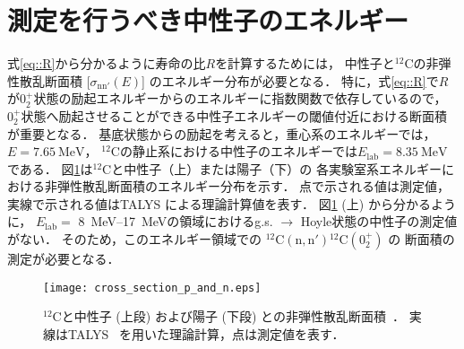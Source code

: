 \documentclass[../master]{subfiles}
\begin{document}
\section{測定を行うべき中性子のエネルギー}
式\eqref{eq::R}から分かるように寿命の比$R$を計算するためには，
中性子と${}^{12}\mathrm{C}$の非弾性散乱断面積 [$\sigma_\mathrm{nn'} (E)$] のエネルギー分布が必要となる．
特に，式\eqref{eq::R}で$R$が$0_2^+$状態の励起エネルギーからのエネルギーに指数関数で依存しているので，
$0_2^+$状態へ励起させることができる中性子エネルギーの閾値付近における断面積が重要となる．
基底状態からの励起を考えると，重心系のエネルギーでは，$E=\SI{7.65}{\mega\electronvolt}$，
${}^{12}\mathrm{C}$の静止系における中性子のエネルギーでは$E_{\text{lab}} = \SI{8.35}{\mega\electronvolt}$である．
図\ref{fig::crosssection_pres}は${}^{12}\mathrm{C}$と中性子（上）または陽子（下）の
各実験室系エネルギーにおける非弾性散乱断面積のエネルギー分布を示す．
点で示される値は測定値，実線で示される値はTALYS による理論計算値を表す．
図\ref{fig::crosssection_pres} (上) から分かるように，
$E_{\text{lab}} =$ \SIrange{8}{17}{\mega\electronvolt}の領域におけるg.s. $\rightarrow$ Hoyle状態の中性子の測定値がない．
そのため，このエネルギー領域での ${}^{12}\mathrm{C}(\mathrm{n},\mathrm{n}'){}^{12}\mathrm{C} (0_2^+)$ の
断面積の測定が必要となる．
\begin{figure}
  \centering
  \texttt{[image: cross\_section\_p\_and\_n.eps]}
  \caption[${}^{12}\mathrm{C}$と中性子 (上段) および陽子 (下段) との非弾性散乱断面積．]
          {${}^{12}\mathrm{C}$と中性子 (上段) および陽子 (下段) との非弾性散乱断面積~\cite{hotdensemedium}．
  実線はTALYS~\cite{talys-1.0} を用いた理論計算，点は測定値を表す．}
  \label{fig::crosssection_pres}
\end{figure}
\end{document}
